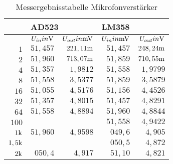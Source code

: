 \begin{table}[H]
\centering
\caption{Messergebnisstabelle Mikrofonverstärker}
\label{tab:Mikrofon_erg_tab}
\begin{tabular}{r||r|r||r|r|}
\cline{2-5}
                                                & \multicolumn{2}{l||}{AD523} & \multicolumn{2}{l|}{LM358} \\ \hline
\rowcolor[HTML]{C0C0C0} 
\multicolumn{1}{|r||}{\cellcolor[HTML]{C0C0C0}$f{ in }\Hz$} &$ U_{in}{ in }\text{V}       $&$ U_{out}{ in }\text{mV}     $&$ U_{in}{ in }\text{mV}        $&$ U_{out}{ in }\text{V}   $\\ \hline
\multicolumn{1}{|r||}{$1$}                         &$ 51,457    $&$ 221,11\text{m}   $&$ 51,457   $&$ 248,24\text{m}    $\\ \hline
\multicolumn{1}{|r||}{$2$}                         &$ 51,960    $&$ 713,07\text{m}   $&$ 51,859   $&$ 710,55\text{m}    $\\ \hline
\multicolumn{1}{|r||}{$4$}                         &$ 51,357    $&$ 1,9812      $&$ 51,558   $&$ 1,9799       $\\ \hline
\multicolumn{1}{|r||}{$8$}                         &$ 51,558    $&$ 3,5377      $&$ 51,859   $&$ 3,5879       $\\ \hline
\multicolumn{1}{|r||}{$16$}                        &$ 51,055    $&$ 4,5176      $&$ 51,156   $&$ 4,4526       $\\ \hline
\multicolumn{1}{|r||}{$32$}                        &$ 51,357    $&$ 4,8015      $&$ 51,457   $&$ 4,8291       $\\ \hline
\multicolumn{1}{|r||}{$64$}                        &$ 51,558    $&$ 4,8894      $&$ 51,960   $&$ 4,8844       $\\ \hline
\multicolumn{1}{|r||}{$100$}                       &$              $&$             $&$ 51,558   $&$ 4,9422       $\\ \hline
\multicolumn{1}{|r||}{$1\text{k}$}                       &$ 51,960    $&$ 4,9598      $&$ 049,6    $&$ 4,905        $\\ \hline
\multicolumn{1}{|r||}{$1,5\text{k}$}                     &$              $&$             $&$ 050,5    $&$ 4,872        $\\ \hline
\multicolumn{1}{|r||}{$2\text{k}$}                       &$ 050,4     $&$ 4,917       $&$ 51,10    $&$ 4,821        $\\ \hline

\end{tabular}
\end{table}
